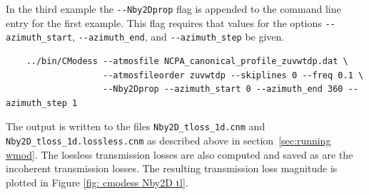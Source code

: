 In the third example the \verb+--Nby2Dprop+ flag is appended to the command line entry for the first example. This flag requires that values for the options \verb+--azimuth_start+, \verb+--azimuth_end+, and \verb+--azimuth_step+ be given. 
\begin{verbatim} 
    ../bin/CModess --atmosfile NCPA_canonical_profile_zuvwtdp.dat \
                   --atmosfileorder zuvwtdp --skiplines 0 --freq 0.1 \
                   --Nby2Dprop --azimuth_start 0 --azimuth_end 360 --azimuth_step 1
\end{verbatim}
The output is written to the files \verb+Nby2D_tloss_1d.cnm+ and \verb+Nby2D_tloss_1d.lossless.cnm+ as described above in section~\ref{sec:running wmod}. The lossless transmission losses are also computed and saved as are the incoherent transmission losses. The resulting transmission loss magnitude is plotted in Figure \ref{fig: cmodess Nby2D tl}. 

